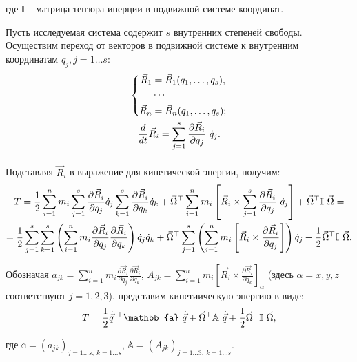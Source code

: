 \documentclass[12pt]{article}
\newcommand{\bbA}{\mathbb{A}}
\newcommand{\bba}{\mathbb{a}}
\newcommand{\bbI}{\mathbb{I}}
\newcommand{\vlevo}{\hspace*{-0.63cm}}
\newcommand{\vverh}{\vspace*{-0.1cm}}
\begin{document}
\vlevo где $\mathbb{I}$ -- матрица тензора инерции в подвижной системе координат.

Пусть исследуемая система содержит $s$ внутренних степеней свободы. Осуществим переход от векторов в подвижной системе к внутренним координатам $q_j, j=1 \dots s$:
\vverh
\begin{gather}
\left\{
\begin{aligned}
\vec{R}_1 &= \vec{R}_1 (q_1, \dots, q_s), \\
&\cdots \\
\vec{R}_n &= \vec{R}_n (q_1, \dots, q_s);
\end{aligned}
\right. \notag \\
\frac{d}{dt} \vec{R}_i = \sum_{j=1}^{s} \frac{\partial \vec{R}_i}{\partial q_j} \ \dot{q}_j \notag .
\end{gather}

Подставляя $\dot{\vec{R}}_i$ в выражение для кинетической энергии, получим:
\vverh
\begin{gather}
T = \frac{1}{2} \sum_{i=1}^{n} m_i \sum_{j=1}^{s} \frac{\partial \vec{R}_i}{\partial q_j} \dot{q}_j \sum_{k=1}^{s} \frac{\partial \vec{R}_i}{\partial q_k} \dot{q}_k + \vec{\Omega}^\top \sum_{i=1}^{n} m_i \left[ \vec{R}_i \times \sum_{j=1}^{s} \frac{\partial \vec{R}_i}{\partial q_j} \ \dot{q}_j \right] + \vec{\Omega}^\top \bbI \ \vec{\Omega} = \notag \\
= \frac{1}{2} \sum_{j=1}^{s} \sum_{k=1}^{s} \left( \sum_{i=1}^{n} m_i \frac{\partial \vec{R}_i}{\partial q_j} \frac{\partial \vec{R}_i}{\partial q_k} \right) \dot{q}_j \dot{q}_k + \vec{\Omega}^\top \sum_{j=1}^{s} \left( \sum_{i=1}^{n} m_i \left[ \vec{R}_i \times \frac{\partial \vec{R}_i}{\partial q_j} \right] \right) \dot{q}_j + \frac{1}{2} \vec{\Omega}^\top \bbI \ \vec{\Omega} \notag .
\end{gather}

Обозначая $a_{jk} = \sum_{i=1}^{n} m_i \frac{\partial \vec{R}_i}{\partial q_j} \frac{\partial \vec{R}_i}{\partial q_k}$, $A_{jk} = \sum_{i=1}^{n} m_i \left[ \vec{R}_i \times \frac{\partial \vec{R}_i}{\partial q_k} \right]_{\alpha}$ (здесь $\alpha = x,y,z$ соответствуют $j=1,2,3$), представим кинетиическую энергию в виде:
\vverh
\begin{gather}
T = \frac{1}{2} \dot{\vec{q}}^{\ \top} \mathbb{a} \ \dot{\vec{q}} + \vec{\Omega}^\top \mathbb{A} \ \dot{\vec{q}} + \frac{1}{2} \vec{\Omega}^\top \mathbb{I} \ \vec{\Omega} \notag ,
\end{gather}

\vlevo где $\bba = (a_{jk})_{j=1 \dots s, \ k=1 \dots s}$, $\bbA = (A_{jk})_{j=1 \dots 3, \ k=1 \dots s}$.
\end{document}
